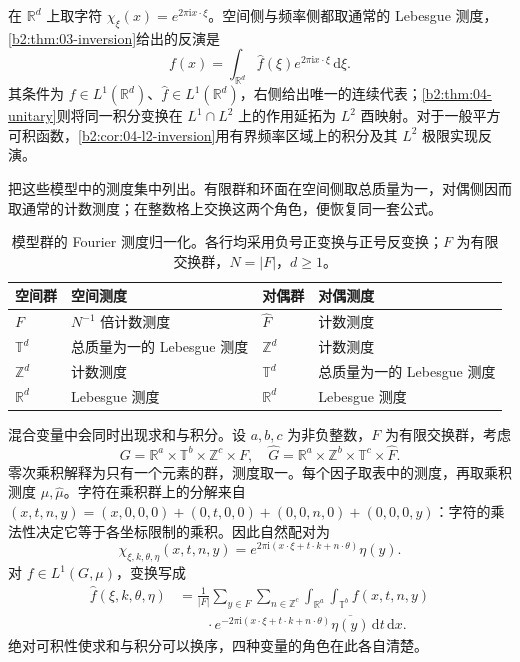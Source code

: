 在 \(\mathbb R^d\) 上取字符 \(\chi_\xi(x)=e^{2\pi\mathrm i x\cdot\xi}\)。空间侧与频率侧都取通常的 Lebesgue 测度，\cref{b2:thm:03-inversion}给出的反演是
\[
 f(x)=\int_{\mathbb R^d}\widehat f(\xi)e^{2\pi\mathrm i x\cdot\xi}\,\mathrm d\xi.
\]
其条件为 \(f\in L^1(\mathbb R^d)\)、\(\widehat f\in L^1(\mathbb R^d)\)，右侧给出唯一的连续代表；\cref{b2:thm:04-unitary}则将同一积分变换在 \(L^1\cap L^2\) 上的作用延拓为 \(L^2\) 酉映射。对于一般平方可积函数，\cref{b2:cor:04-l2-inversion}用有界频率区域上的积分及其 \(L^2\) 极限实现反演。

把这些模型中的测度集中列出。有限群和环面在空间侧取总质量为一，对偶侧因而取通常的计数测度；在整数格上交换这两个角色，便恢复同一套公式。
\begin{table}[htbp]
\centering
\caption[模型群的 Fourier 测度归一化]{模型群的 Fourier 测度归一化。各行均采用负号正变换与正号反变换；\(F\) 为有限交换群，\(N=|F|\)，\(d\ge1\)。}
\label{b2:tab:I4-normalization}
\begin{tabularx}{\linewidth}{@{}l>{\raggedright\arraybackslash}Xl>{\raggedright\arraybackslash}X@{}}
\toprule
空间群 & 空间测度 & 对偶群 & 对偶测度\\
\midrule
\(F\) & \(N^{-1}\) 倍计数测度 & \(\widehat F\) & 计数测度\\
\(\mathbb T^d\) & 总质量为一的 Lebesgue 测度 & \(\mathbb Z^d\) & 计数测度\\
\(\mathbb Z^d\) & 计数测度 & \(\mathbb T^d\) & 总质量为一的 Lebesgue 测度\\
\(\mathbb R^d\) & Lebesgue 测度 & \(\mathbb R^d\) & Lebesgue 测度\\
\bottomrule
\end{tabularx}
\end{table}

混合变量中会同时出现求和与积分。设 \(a,b,c\) 为非负整数，\(F\) 为有限交换群，考虑
\[
 G=\mathbb R^a\times\mathbb T^b\times\mathbb Z^c\times F,
 \quad
 \widehat G=\mathbb R^a\times\mathbb Z^b\times\mathbb T^c\times\widehat F.
\]
零次乘积解释为只有一个元素的群，测度取一。每个因子取表中的测度，再取乘积测度 \(\mu,\widehat\mu\)。字符在乘积群上的分解来自
\( (x,t,n,y)=(x,0,0,0)+(0,t,0,0)+(0,0,n,0)+(0,0,0,y)\)：字符的乘法性决定它等于各坐标限制的乘积。因此自然配对为
\[
 \chi_{\xi,k,\theta,\eta}(x,t,n,y)
 =e^{2\pi\mathrm i(x\cdot\xi+t\cdot k+n\cdot\theta)}\eta(y).
\]
对 \(f\in L^1(G,\mu)\)，变换写成
\begin{align*}
 \widehat f(\xi,k,\theta,\eta)
 &=\frac1{|F|}\sum_{y\in F}\sum_{n\in\mathbb Z^c}
       \int_{\mathbb R^a}\int_{\mathbb T^b}
       f(x,t,n,y)\\[-2pt]
 &\hspace{2em}\cdot e^{-2\pi\mathrm i(x\cdot\xi+t\cdot k+n\cdot\theta)}
          \overline{\eta(y)}\,\mathrm dt\,\mathrm dx.
\end{align*}
绝对可积性使求和与积分可以换序，四种变量的角色在此各自清楚。

